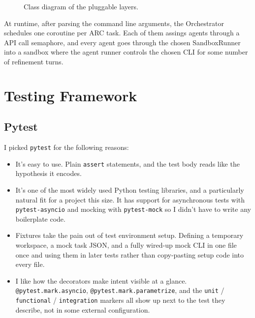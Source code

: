 \documentclass[11pt,a4paper]{article}
\begin{document}
\begin{figure}[h]
  \caption{Class diagram of the pluggable layers.}
  \label{fig:uml}
\end{figure}

At runtime, after parsing the command line arguments, the Orchestrator schedules one coroutine per ARC task. Each of them assings agents through a API call semaphore, and every agent goes through the chosen SandboxRunner into a sandbox where the agent runner controls the chosen CLI for some number of refinement turns.

\section{Testing Framework}

\subsection{Pytest}

I picked \texttt{pytest} for the following reasons:

\begin{itemize}
  \item It's easy to use. Plain \texttt{assert} statements, and the test body reads like the hypothesis it encodes.
  \item It's one of the most widely used Python testing libraries, and a particularly natural fit for a project this size. It has support for asynchronous tests with \texttt{pytest-asyncio} and mocking with \texttt{pytest-mock} so I didn't have to write any boilerplate code.
  \item Fixtures take the pain out of test environment setup. Defining a temporary workspace, a mock task JSON, and a fully wired-up mock CLI in one file once and using them in later tests rather than copy-pasting setup code into every file.
  \item I like how the decorators make intent visible at a glance. \texttt{@pytest.mark.asyncio}, \texttt{@pytest.mark.parametrize}, and the \texttt{unit} / \texttt{functional} / \texttt{integration} markers all show up next to the test they describe, not in some external configuration.
\end{itemize}
\end{document}
